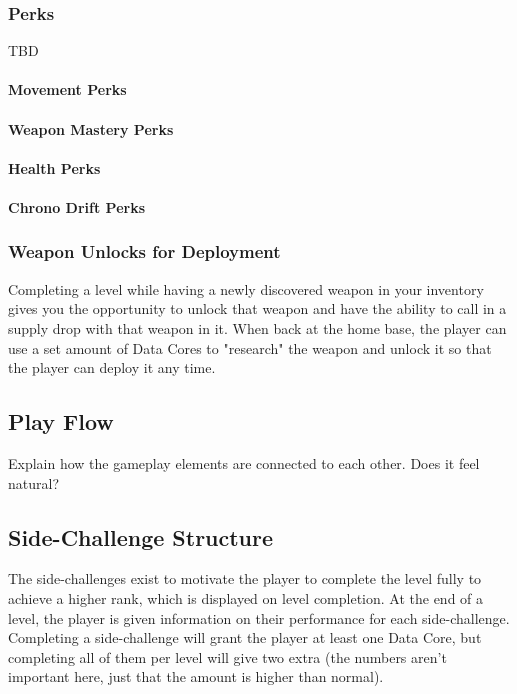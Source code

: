 \documentclass[12pt]{article}
\begin{document}
\subsubsection{Perks}

TBD

\paragraph{Movement Perks}

\paragraph{Weapon Mastery Perks}

\paragraph{Health Perks}

\paragraph{Chrono Drift Perks}

\subsubsection{Weapon Unlocks for Deployment}

Completing a level while having a newly discovered weapon in your inventory gives you the opportunity to unlock that weapon and have the ability to call in a supply drop with that weapon in it. When back at the home base, the player can use a set amount of Data Cores to "research" the weapon and unlock it so that the player can deploy it any time. 

\subsection{Play Flow}

Explain how the gameplay elements are connected to each other. Does it feel natural?

\subsection{Side-Challenge Structure}

The side-challenges exist to motivate the player to complete the level fully to achieve a higher rank, which is displayed on level completion. At the end of a level, the player is given information on their performance for each side-challenge. Completing a side-challenge will grant the player at least one Data Core, but completing all of them per level will give two extra (the numbers aren't important here, just that the amount is higher than normal). 
\end{document}
